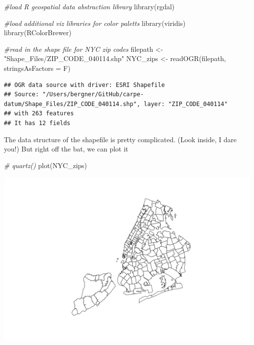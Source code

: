 \documentclass[
  openany]{book}
\newenvironment{Shaded}{\begin{snugshade}}{\end{snugshade}}
\newcommand{\AttributeTok}[1]{\textcolor[rgb]{0.77,0.63,0.00}{#1}}
\newcommand{\CommentTok}[1]{\textcolor[rgb]{0.56,0.35,0.01}{\textit{#1}}}
\newcommand{\FunctionTok}[1]{\textcolor[rgb]{0.00,0.00,0.00}{#1}}
\newcommand{\NormalTok}[1]{#1}
\newcommand{\OtherTok}[1]{\textcolor[rgb]{0.56,0.35,0.01}{#1}}
\newcommand{\StringTok}[1]{\textcolor[rgb]{0.31,0.60,0.02}{#1}}
\begin{document}
\begin{Shaded}
\begin{Highlighting}[]
\CommentTok{\#load R geospatial data abstraction library}
\FunctionTok{library}\NormalTok{(rgdal)}

\CommentTok{\#load additional viz libraries for color paletts}
\FunctionTok{library}\NormalTok{(viridis)}
\FunctionTok{library}\NormalTok{(RColorBrewer)}

\CommentTok{\#read in the shape file for NYC zip codes}
\NormalTok{filepath }\OtherTok{\textless{}{-}} \StringTok{"Shape\_Files/ZIP\_CODE\_040114.shp"}
\NormalTok{NYC\_zips }\OtherTok{\textless{}{-}} \FunctionTok{readOGR}\NormalTok{(filepath, }\AttributeTok{stringsAsFactors =}\NormalTok{ F)}
\end{Highlighting}
\end{Shaded}

\begin{verbatim}
## OGR data source with driver: ESRI Shapefile 
## Source: "/Users/bergner/GitHub/carpe-datum/Shape_Files/ZIP_CODE_040114.shp", layer: "ZIP_CODE_040114"
## with 263 features
## It has 12 fields
\end{verbatim}

The data structure of the shapefile is pretty complicated. (Look inside, I dare you!)
But right off the bat, we can plot it

\begin{Shaded}
\begin{Highlighting}[]
\CommentTok{\# quartz()}
\FunctionTok{plot}\NormalTok{(NYC\_zips)}
\end{Highlighting}
\end{Shaded}

\begin{center}\includegraphics[width=0.9\linewidth]{carpedatum_files/figure-html/unnamed-chunk-81-1} \end{center}
\end{document}

